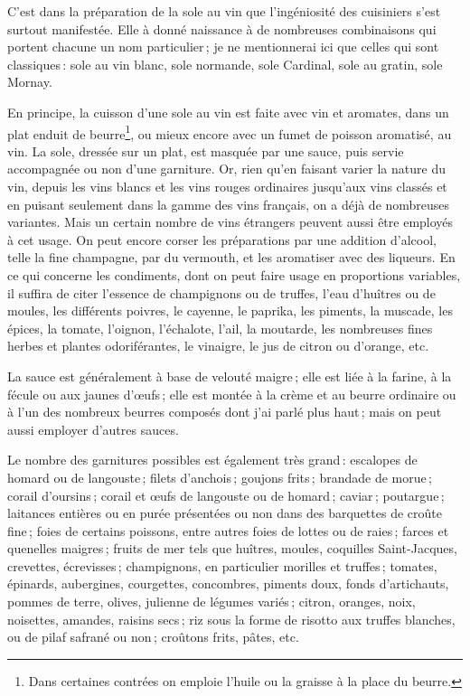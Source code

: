 C'est dans la préparation de la sole au vin que l'ingéniosité des cuisiniers
s'est surtout manifestée. Elle à donné naissance à de nombreuses combinaisons
qui portent chacune un nom particulier ; je ne mentionnerai ici que celles qui
sont classiques : sole au vin blanc, sole normande, sole Cardinal, sole au
gratin, sole Mornay.

En principe, la cuisson d'une sole au vin est faite avec vin et aromates, dans
un plat enduit de beurre\footnote{Dans certaines contrées on emploie l'huile ou
la graisse à la place du beurre.}, ou mieux encore avec un fumet de poisson
aromatisé, au vin. La sole, dressée sur un plat, est masquée par une sauce,
puis servie accompagnée ou non d'une garniture. Or, rien qu'en faisant varier
la nature du vin, depuis les vins blancs et les vins rouges ordinaires
jusqu'aux vins classés et en puisant seulement dans la gamme des vins français,
on a déjà de nombreuses variantes. Mais un certain nombre de vins étrangers
peuvent aussi être employés à cet usage. On peut encore corser les préparations
par une addition d'alcool, telle la fine champagne, par du vermouth, et les
aromatiser avec des liqueurs. En ce qui concerne les condiments, dont on peut
faire usage en proportions variables, il suffira de citer l'essence de
champignons ou de truffes, l’eau d'huîtres ou de moules, les différents
poivres, le cayenne, le paprika, les piments, la muscade, les épices, la
tomate, l'oignon, l'échalote, l'ail, la moutarde, les nombreuses fines herbes
et plantes odoriférantes, le vinaigre, le jus de citron ou d'orange, etc.

La sauce est généralement à base de velouté maigre ; elle est liée à la farine,
à la fécule ou aux jaunes d'œufs ; elle est montée à la crème et au beurre
ordinaire ou à l’un des nombreux beurres composés dont j'ai parlé plus haut ;
mais on peut aussi employer d'autres sauces.

Le nombre des garnitures possibles est également très grand : escalopes de
homard ou de langouste ; filets d'anchois ; goujons frits ; brandade de morue ;
corail d'oursins ; corail et œufs de langouste ou de homard ; caviar ;
poutargue ; laitances entières ou en purée présentées ou non dans des
barquettes de croûte fine ; foies de certains poissons, entre autres foies de
lottes ou de raies ; farces et quenelles maigres ; fruits de mer tels que
huîtres, moules, coquilles Saint-Jacques, crevettes, écrevisses ; champignons,
en particulier morilles et truffes ; tomates, épinards, aubergines, courgettes,
concombres, piments doux, fonds d'artichauts, pommes de terre, olives, julienne
de légumes variés ; citron, oranges, noix, noisettes, amandes, raisins secs ;
riz sous la forme de risotto aux truffes blanches, ou de pilaf safrané ou non ;
croûtons frits, pâtes, etc.


